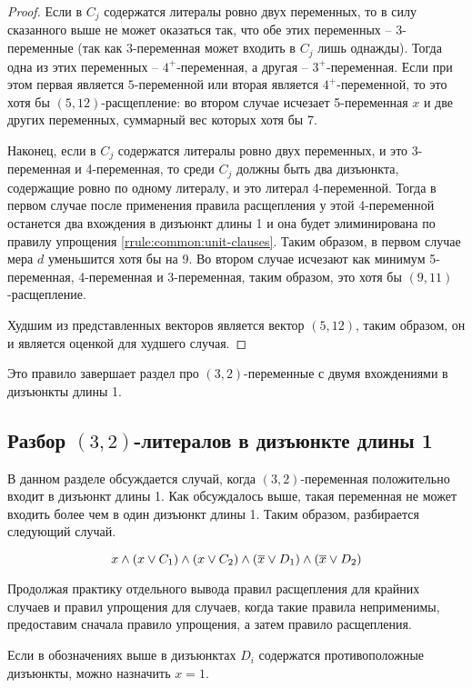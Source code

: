 \begin{proof}
  Если в $C_j$ содержатся литералы ровно двух переменных, то в силу сказанного выше не может оказаться так, что обе этих переменных -- 3-переменные (так как 3-переменная может входить в $C_j$ лишь однажды). Тогда одна из этих переменных -- $4^+$-переменная, а другая -- $3^+$-переменная. Если при этом первая является $5$-переменной или вторая является $4^+$-переменной, то это хотя бы $(5,12)$-расщепление: во втором случае исчезает 5-переменная $x$ и две других переменных, суммарный вес которых хотя бы 7.

  Наконец, если в $C_j$ содержатся литералы ровно двух переменных, и это 3-переменная и 4-переменная, то среди $C_j$ должны быть два дизъюнкта, содержащие ровно по одному литералу, и это литерал 4-переменной. Тогда в первом случае после применения правила расщепления у этой 4-переменной останется два вхождения в дизъюнкт длины 1 и она будет элиминирована по правилу упрощения \ref{rrule:common:unit-clauses}. Таким образом, в первом случае мера $d$ уменьшится хотя бы на 9. Во втором случае исчезают как минимум 5-переменная, 4-переменная и 3-переменная, таким образом, это хотя бы $(9,11)$-расщепление.

  Худшим из представленных векторов является вектор $(5,12)$, таким образом, он и является оценкой для худшего случая.
\end{proof}

Это правило завершает раздел про $(3,2)$-переменные с двумя вхождениями в дизъюнкты длины 1.

\subsection{Разбор $(3,2)$-литералов в дизъюнкте длины 1}
\label{subsec:n5:32-+uc}

В данном разделе обсуждается случай, когда $(3,2)$-переменная положительно входит в дизъюнкт длины 1. Как обсуждалось выше, такая переменная не может входить более чем в один дизъюнкт длины 1. Таким образом, разбирается следующий случай.

$$
 x \wedge (x \vee C_1) \wedge (x \vee C_2) \wedge (\overline{x} \vee D_1) \wedge (\overline{x} \vee D_2)
$$

Продолжая практику отдельного вывода правил расщепления для крайних случаев и правил упрощения для случаев, когда такие правила неприменимы, предоставим сначала правило упрощения, а затем правило расщепления.

\begin{rrule}
 Если в обозначениях выше в дизъюнктах $D_i$ содержатся противоположные дизъюнкты, можно назначить $x = 1$.
 \label{rrule:n5:32-+uc}
\end{rrule}


